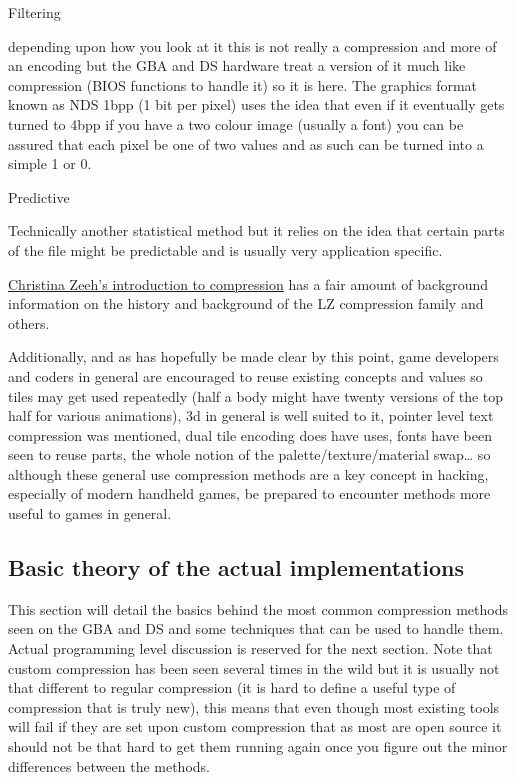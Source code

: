 \documentclass[
]{book}
\begin{document}
Filtering

depending upon how you look at it this is not really a compression and more of an encoding but the GBA and DS hardware treat a version of it much like compression (BIOS functions to handle it) so it is here. The graphics format known as NDS 1bpp (1 bit per pixel) uses the idea that even if it eventually gets turned to 4bpp if you have a two colour image (usually a font) you can be assured that each pixel be one of two values and as such can be turned into a simple 1 or 0.

Predictive

Technically another statistical method but it relies on the idea that certain parts of the file might be predictable and is usually very application specific.

\href{https://ece.uwaterloo.ca/~ece611/LempelZiv.pdf}{Christina Zeeh's introduction to compression} has a fair amount of background information on the history and background of the LZ compression family and others.

Additionally, and as has hopefully be made clear by this point, game developers and coders in general are encouraged to reuse existing concepts and values so tiles may get used repeatedly (half a body might have twenty versions of the top half for various animations), 3d in general is well suited to it, pointer level text compression was mentioned, dual tile encoding does have uses, fonts have been seen to reuse parts, the whole notion of the palette/texture/material swap\ldots{} so although these general use compression methods are a key concept in hacking, especially of modern handheld games, be prepared to encounter methods more useful to games in general.

\hypertarget{basic-theory-of-the-actual-implementations}{%
\subsection{Basic theory of the actual implementations}\label{basic-theory-of-the-actual-implementations}}

This section will detail the basics behind the most common compression methods seen on the GBA and DS and some techniques that can be used to handle them. Actual programming level discussion is reserved for the next section. Note that custom compression has been seen several times in the wild but it is usually not that different to regular compression (it is hard to define a useful type of compression that is truly new), this means that even though most existing tools will fail if they are set upon custom compression that as most are open source it should not be that hard to get them running again once you figure out the minor differences between the methods.
\end{document}
